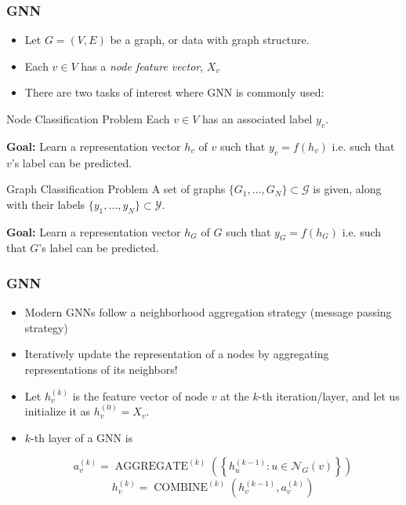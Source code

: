 \documentclass{beamer}
\DeclareMathOperator{\aggregate}{AGGREGATE}
\DeclareMathOperator{\combine}{COMBINE}
\begin{document}
\begin{frame}
\frametitle{GNN}

\begin{itemize}
	\item Let $G = (V, E)$ be a graph, or data with graph structure. \pause
	
	\item Each $v \in V$ has a {\it node feature vector}, $X_v$ \pause
	
	\item There are two tasks of interest where GNN is commonly used: \pause
\end{itemize}

\begin{block}{Node Classification Problem}
Each $v \in V$ has an associated label $y_v$.

{\bf Goal:} Learn a representation vector $h_v$ of $v$ such that $y_v = f(h_v)$ i.e. such that $v$'s label can be predicted. 
\end{block} \pause

\begin{block}{Graph Classification Problem}
A set of graphs $\{G_1, \dots, G_N\} \subset \mathcal{G}$ is given, along with their labels $\{y_1, \dots, y_N\} \subset \mathcal{Y}$.

{\bf Goal:} Learn a representation vector $h_G$ of $G$ such that $y_G = f(h_G)$ i.e. such that $G$'s label can be predicted. 
\end{block}

\end{frame}

\begin{frame}
\frametitle{GNN}

\begin{itemize}
	\item Modern GNNs follow a \alert{neighborhood aggregation strategy} (message passing strategy) \pause
	
	\item Iteratively update the representation of a nodes by aggregating representations of its neighbors! \pause
	
	\item Let $h_v^{(k)}$ is the feature vector of node $v$ at the $k$-th iteration/layer, and let us initialize it as $h_v^{(0)} = X_v$. \pause
	
	\item $k$-th layer of a GNN is
	
	$$a_v^{(k)} = \aggregate^{(k)} \left( \left\{ h_u^{(k - 1)} : u \in \mathcal{N}_G(v) \right\} \right)$$
	$$h_v^{(k)} = \combine^{(k)} \left( h_v^{(k - 1)}, a_v^{(k)} \right)$$
\end{itemize}

\end{frame}
\end{document}
